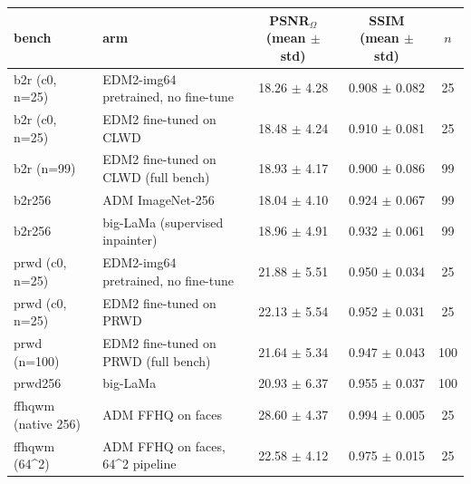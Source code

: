 \begin{tabular}{llccc}
\toprule
bench & arm & PSNR$_\Omega$ (mean $\pm$ std) & SSIM (mean $\pm$ std) & $n$\\
\midrule
b2r (c0, n=25) & EDM2-img64 pretrained, no fine-tune & 18.26 $\pm$ 4.28 & 0.908 $\pm$ 0.082 & 25\\
b2r (c0, n=25) & EDM2 fine-tuned on CLWD & 18.48 $\pm$ 4.24 & 0.910 $\pm$ 0.081 & 25\\
\midrule
b2r (n=99) & EDM2 fine-tuned on CLWD (full bench) & 18.93 $\pm$ 4.17 & 0.900 $\pm$ 0.086 & 99\\
\midrule
b2r256 & ADM ImageNet-256 & 18.04 $\pm$ 4.10 & 0.924 $\pm$ 0.067 & 99\\
b2r256 & big-LaMa (supervised inpainter) & 18.96 $\pm$ 4.91 & 0.932 $\pm$ 0.061 & 99\\
\midrule
prwd (c0, n=25) & EDM2-img64 pretrained, no fine-tune & 21.88 $\pm$ 5.51 & 0.950 $\pm$ 0.034 & 25\\
prwd (c0, n=25) & EDM2 fine-tuned on PRWD & 22.13 $\pm$ 5.54 & 0.952 $\pm$ 0.031 & 25\\
\midrule
prwd (n=100) & EDM2 fine-tuned on PRWD (full bench) & 21.64 $\pm$ 5.34 & 0.947 $\pm$ 0.043 & 100\\
\midrule
prwd256 & big-LaMa & 20.93 $\pm$ 6.37 & 0.955 $\pm$ 0.037 & 100\\
\midrule
ffhqwm (native 256) & ADM FFHQ on faces & 28.60 $\pm$ 4.37 & 0.994 $\pm$ 0.005 & 25\\
\midrule
ffhqwm (64^2) & ADM FFHQ on faces, 64^2 pipeline & 22.58 $\pm$ 4.12 & 0.975 $\pm$ 0.015 & 25\\
\bottomrule
\end{tabular}
